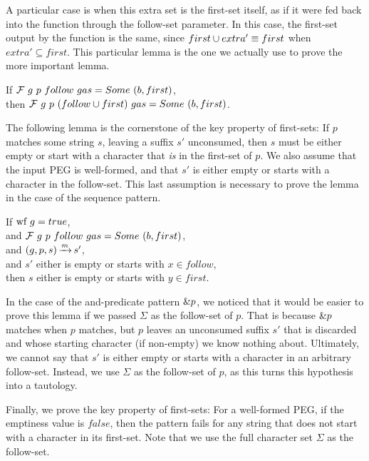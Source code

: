 A particular case
is when this extra set is the first-set itself,
as if it were fed back into the function
through the follow-set parameter.
In this case, the first-set output by the function is the same,
since $first \cup extra' \equiv first$ when $extra' \subseteq first$.
This particular lemma
is the one we actually use
to prove the more important lemma.

\begin{lemma}
If $\mathcal{F}{}\ g\ p\ follow\ gas = Some\ (b, first)$, \\
then $\mathcal{F}{}\ g\ p\ (follow \cup first)\ gas = Some\ (b, first)$.
\end{lemma}

The following lemma is the cornerstone of the key property of first-sets:
If $p$ matches some string $s$, leaving a suffix $s'$ unconsumed,
then $s$ must be either empty or start with a character
that \emph{is} in the first-set of $p$.
We also assume that the input PEG is well-formed,
and that $s'$ is either empty or starts with a character in the follow-set.
This last assumption is necessary to prove the lemma
in the case of the sequence pattern.

\begin{lemma}
If $\text{wf}\ g = true$, \\
and $\mathcal{F}{}\ g\ p\ follow\ gas = Some\ (b, first)$, \\
and $(g,p,s) \operatorname{\xrightarrow{\mathit{m}}} s'$, \\
and $s'$ either is empty or starts with $x \in follow$, \\
then $s$ either is empty or starts with $y \in first$.
\end{lemma}

In the case of the and-predicate pattern $\&p$,
we noticed that it would be easier to prove this lemma
if we passed $\Sigma$ as the follow-set of $p$.
That is because $\&p$ matches when $p$ matches,
but $p$ leaves an unconsumed suffix $s'$ that is
discarded and whose starting character (if non-empty)
we know nothing about. Ultimately, we cannot say that $s'$
is either empty or starts with a character in
an arbitrary follow-set. Instead, we use $\Sigma$
as the follow-set of $p$, as this turns
this hypothesis into a tautology.

Finally, we prove the key property of first-sets:
For a well-formed PEG,
if the emptiness value is $false$,
then the pattern fails for any string
that does not start with a character in its first-set.
Note that we use the full character set $\Sigma$ as the follow-set.

